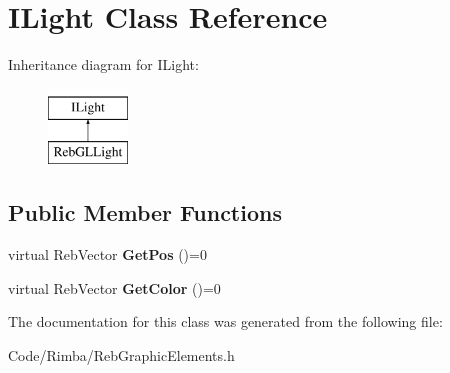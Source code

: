 \hypertarget{class_i_light}{}\section{I\+Light Class Reference}
\label{class_i_light}
Inheritance diagram for I\+Light\+:\begin{figure}[H]
\begin{center}
\leavevmode
\includegraphics[height=2.000000cm]{class_i_light}
\end{center}
\end{figure}
\subsection*{Public Member Functions}
\begin{DoxyCompactItemize}
\item 
virtual Reb\+Vector {\bfseries Get\+Pos} ()=0\hypertarget{class_i_light_aab76acc774f2851d11973376d0ab72b3}{}\label{class_i_light_aab76acc774f2851d11973376d0ab72b3}

\item 
virtual Reb\+Vector {\bfseries Get\+Color} ()=0\hypertarget{class_i_light_a1e4c3950728932cfd29eb94da766a2f1}{}\label{class_i_light_a1e4c3950728932cfd29eb94da766a2f1}

\end{DoxyCompactItemize}


The documentation for this class was generated from the following file\+:\begin{DoxyCompactItemize}
\item 
Code/\+Rimba/Reb\+Graphic\+Elements.\+h\end{DoxyCompactItemize}

